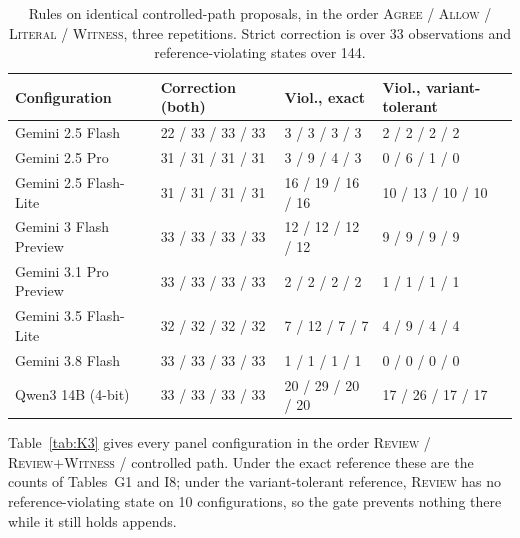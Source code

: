 \documentclass[acmsmall,review]{acmart}
\newcommand{\agree}{\textsc{Agree}}
\newcommand{\allow}{\textsc{Allow}}
\newcommand{\literal}{\textsc{Literal}}
\newcommand{\witness}{\textsc{Witness}}
\newcommand{\review}{\textsc{Review}}
\begin{document}
\begin{table}[H]
\centering
\caption{Rules on identical controlled-path proposals, in the order \agree{} / \allow{} / \literal{} / \witness{}, three repetitions. Strict correction is over 33 observations and reference-violating states over 144.}\label{tab:K2}
\small
\setlength{\tabcolsep}{3pt}
\begin{tabular}{@{}llll@{}}
\toprule
\textbf{Configuration} & \textbf{Correction (both)} & \textbf{Viol., exact} & \textbf{Viol., variant-tolerant} \\
\midrule
Gemini 2.5 Flash & 22 / 33 / 33 / 33 & 3 / 3 / 3 / 3 & 2 / 2 / 2 / 2 \\
Gemini 2.5 Pro & 31 / 31 / 31 / 31 & 3 / 9 / 4 / 3 & 0 / 6 / 1 / 0 \\
Gemini 2.5 Flash-Lite & 31 / 31 / 31 / 31 & 16 / 19 / 16 / 16 & 10 / 13 / 10 / 10 \\
Gemini 3 Flash Preview & 33 / 33 / 33 / 33 & 12 / 12 / 12 / 12 & 9 / 9 / 9 / 9 \\
Gemini 3.1 Pro Preview & 33 / 33 / 33 / 33 & 2 / 2 / 2 / 2 & 1 / 1 / 1 / 1 \\
Gemini 3.5 Flash-Lite & 32 / 32 / 32 / 32 & 7 / 12 / 7 / 7 & 4 / 9 / 4 / 4 \\
Gemini 3.8 Flash & 33 / 33 / 33 / 33 & 1 / 1 / 1 / 1 & 0 / 0 / 0 / 0 \\
Qwen3 14B (4-bit) & 33 / 33 / 33 / 33 & 20 / 29 / 20 / 20 & 17 / 26 / 17 / 17 \\
\bottomrule
\end{tabular}
\end{table}

Table~\ref{tab:K3} gives every panel configuration in the order \review{} / \review{}+\witness{} / controlled path. Under the exact reference these are the counts of Tables~G1 and I8; under the variant-tolerant reference, \review{} has no reference-violating state on 10 configurations, so the gate prevents nothing there while it still holds appends.
\end{document}
